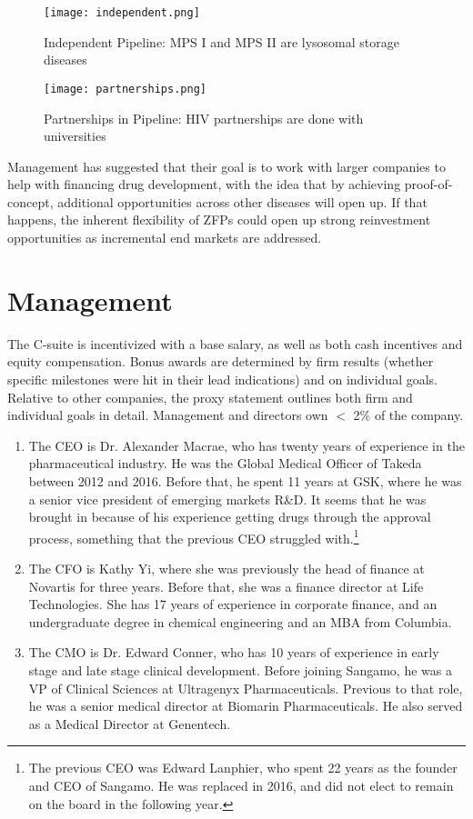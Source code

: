 \documentclass{article} %
\begin{document}
\begin{figure}[h]
\texttt{[image: independent.png]}
\caption{Independent Pipeline: MPS I and MPS II are lysosomal storage diseases}  
\label{fig: industry}
\end{figure} 

\begin{figure}[h]
\texttt{[image: partnerships.png]}
\caption{Partnerships in Pipeline: HIV partnerships are done with universities}  
\label{fig: industry}
\end{figure} 

Management has suggested that their goal is to work with larger companies to help with financing drug development, with the idea that by achieving proof-of-concept, additional opportunities across other diseases will open up. If that happens, the inherent flexibility of ZFPs could open up strong reinvestment opportunities as incremental end markets are addressed. 

\section{Management}

The C-suite is incentivized with a base salary, as well as both cash incentives and equity compensation. Bonus awards are determined by firm results (whether specific milestones were hit in their lead indications) and on individual goals. Relative to other companies, the proxy statement outlines both firm and individual goals in detail. Management and directors own $<$ 2\% of the company. 

\begin{enumerate}

\item The CEO is Dr. Alexander Macrae, who has twenty years of experience in the pharmaceutical industry. He was the Global Medical Officer of Takeda between 2012 and 2016. Before that, he spent 11 years at GSK, where he was a senior vice president of emerging markets R\&D. It seems that he was brought in because of his experience getting drugs through the approval process, something that the previous CEO struggled with.\footnote{The previous CEO was Edward Lanphier, who spent 22 years as the founder and CEO of Sangamo. He was replaced in 2016, and did not elect to remain on the board in the following year. } 

\smallskip
\item The CFO is Kathy Yi, where she was previously the head of finance at Novartis for three years. Before that, she was a finance director at Life Technologies. She has 17 years of experience in corporate finance, and an undergraduate degree in chemical engineering and an MBA from Columbia. 

\smallskip
\item The CMO is Dr. Edward Conner, who has 10 years of experience in early stage and late stage clinical development. Before joining Sangamo, he was a VP of Clinical Sciences at Ultragenyx Pharmaceuticals. Previous to that role, he was a senior medical director at Biomarin Pharmaceuticals. He also served as a Medical Director at Genentech.   
\end{enumerate}
\end{document}
